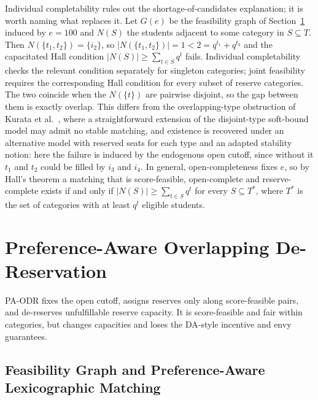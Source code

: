 \documentclass[runningheads]{llncs}
\begin{document}
\begin{nremark}
\label{rem:hall}
Individual completability rules out the shortage-of-candidates explanation; it is worth naming what replaces it. Let $G(e)$ be the feasibility graph of Section~\ref{sec:paodr} induced by $e=100$ and $N(S)$ the students adjacent to some category in $S\subseteq T$. Then $N(\{t_1,t_2\})=\{i_2\}$, so $|N(\{t_1,t_2\})|=1<2=q^{t_1}+q^{t_2}$ and the capacitated Hall condition $|N(S)|\ge\sum_{t\in S}q^t$ fails. Individual completability checks the relevant condition separately for singleton categories; joint feasibility requires the corresponding Hall condition for every subset of reserve categories. The two coincide when the $N(\{t\})$ are pairwise disjoint, so the gap between them is exactly overlap. This differs from the overlapping-type obstruction of Kurata et al.~\cite{KHIY17a}, where a straightforward extension of the disjoint-type soft-bound model may admit no stable matching, and existence is recovered under an alternative model with reserved seats for each type and an adapted stability notion: here the failure is induced by the endogenous open cutoff, since without it $t_1$ and $t_2$ could be filled by $i_3$ and $i_4$. In general, open-completeness fixes $e$, so by Hall's theorem a matching that is score-feasible, open-complete and reserve-complete exists if and only if $|N(S)|\ge\sum_{t\in S}q^t$ for every $S\subseteq T^\ast$, where $T^\ast$ is the set of categories with at least $q^t$ eligible students.
\end{nremark}

\section{Preference-Aware Overlapping De-Reservation}
\label{sec:paodr}

PA-ODR fixes the open cutoff, assigns reserves only along score-feasible pairs, and de-reserves unfulfillable reserve capacity. It is score-feasible and fair within categories, but changes capacities and loses the DA-style incentive and envy guarantees.

\subsection{Feasibility Graph and Preference-Aware Lexicographic Matching}
\end{document}
